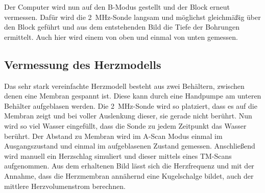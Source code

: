 Der Computer wird nun auf den B-Modus gestellt und der Block erneut vermessen.
Dafür wird die \SI{2}{\mega\hertz}-Sonde langsam und möglichst gleichmäßig über den Block geführt und aus dem entstehenden Bild die Tiefe der Bohrungen ermittelt.
Auch hier wird einem von oben und einmal von unten gemessen.
\subsection{Vermessung des Herzmodells}
Das sehr stark vereinfachte Herzmodell besteht aus zwei Behältern, zwischen denen eine Membran gespannt ist. 
Diese kann durch eine Handpumpe am unteren Behälter aufgeblasen werden.
Die \SI{2}{\mega\hertz}-Sonde wird so platziert, dass es auf die Membran zeigt und bei voller Auslenkung dieser, sie gerade nicht berührt.
Nun wird so viel Wasser eingefüllt, dass die Sonde zu jedem Zeitpunkt das Wasser berührt.
Der Abstand zu Membran wird im A-Scan Modus einmal im Ausgangszustand und einmal im aufgeblasenen Zustand gemessen.
Anschließend wird manuell ein Herzschlag simuliert und dieser mittels eines TM-Scans aufgenommen.
Aus dem erhaltenen Bild lässt sich die Herzfrequenz und mit der Annahme, dass die Herzmembran annähernd eine Kugelschalge bildet, 
auch der mittlere Herzvolumenstrom berechnen.
